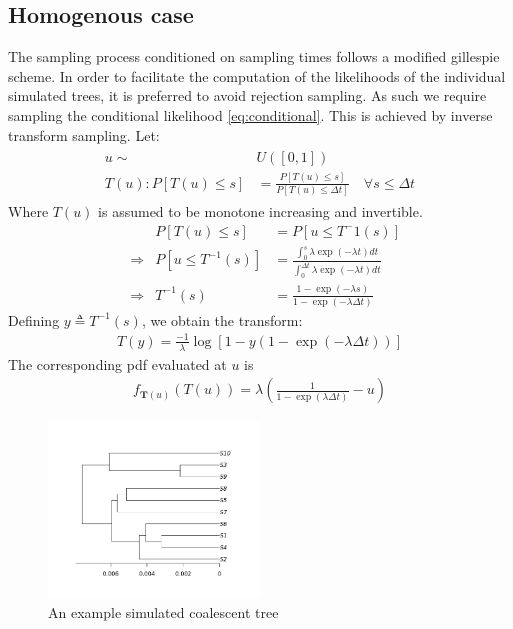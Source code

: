 \documentclass{report}
\theoremstyle{definition}
\begin{document}
\subsection{Homogenous case}
The sampling process conditioned on sampling times follows a modified gillespie scheme. In order to facilitate the computation of the likelihoods of the individual simulated trees, it is preferred to avoid rejection sampling. As such we require sampling the conditional likelihood \ref{eq:conditional}. This is achieved by inverse transform sampling.
Let:
\begin{gather}\label{eq:cond_timedep}
\begin{aligned}
  u\sim& U([0,1])\\
  T(u) : P[T(u)\leq s] &= \frac{P[T(u) \leq s]}{P[T(u) \leq \Delta t]} \quad\forall s \leq \Delta t
\end{aligned}
\end{gather}
Where $T(u)$ is assumed to be monotone increasing and invertible.
\begin{align*}
  &&P[T(u)\leq s] &= P[u\leq T^-1(s)]\\
  &\Rightarrow& P[u\leq T^{-1}(s)] &= \frac{\int_0^s\lambda\exp(-\lambda t)dt}{\int_0^{\Delta t}\lambda\exp(-\lambda t)dt}\\
  &\Rightarrow& T^{-1}(s) &= \frac{1-\exp(-\lambda s)}{1-\exp(-\lambda \Delta t)}
\end{align*}
Defining $y\triangleq T^{-1}(s)$, we obtain the transform:
\begin{gather}
T(y) = \frac{-1}{\lambda}\log[1-y(1-\exp(-\lambda\Delta t))]
\end{gather}
The corresponding pdf evaluated at $u$ is
\begin{gather}
f_{\mathbf{T}(u)}(T(u)) = \lambda \left(\frac{1}{1-\exp(\lambda\Delta t)}-u\right)
\end{gather}
\newpage
\begin{figure}[h]
  \centering
    \includegraphics[width=0.5\textwidth]{plots/Coalescent_Example.png}
    \caption{An example simulated coalescent tree}
\end{figure}
\end{document}
